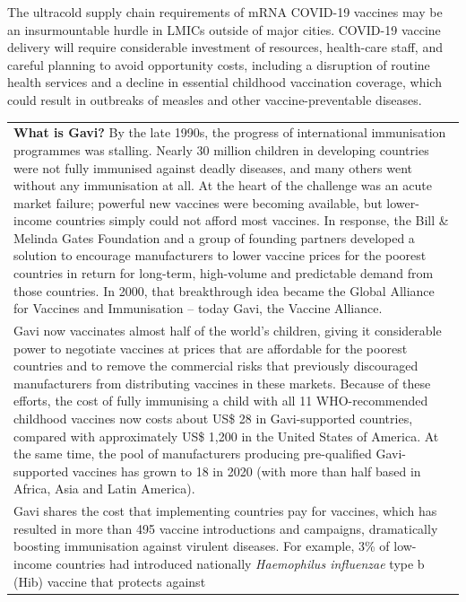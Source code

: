 \documentclass[
  11pt,
  paper=a4,
  ,captions=tableheading
]{scrartcl}
\begin{document}
The ultracold supply chain requirements of mRNA COVID-19 vaccines may be
an insurmountable hurdle in LMICs outside of major cities. COVID-19
vaccine delivery will require considerable investment of resources,
health-care staff, and careful planning to avoid opportunity costs,
including a disruption of routine health services and a decline in
essential childhood vaccination coverage, which could result in
outbreaks of measles and other vaccine-preventable diseases.

\begin{longtable}[]{@{}
  >{\raggedright\arraybackslash}p{}@{}}
\toprule
\endhead
\textbf{What is Gavi?} By the late 1990s, the progress of international
immunisation programmes was stalling. Nearly 30 million children in
developing countries were not fully immunised against deadly diseases,
and many others went without any immunisation at all. At the heart of
the challenge was an acute market failure; powerful new vaccines were
becoming available, but lower-income countries simply could not afford
most vaccines. In response, the Bill \& Melinda Gates Foundation and a
group of founding partners developed a solution to encourage
manufacturers to lower vaccine prices for the poorest countries in
return for long-term, high-volume and predictable demand from those
countries. In 2000, that breakthrough idea became the Global Alliance
for Vaccines and Immunisation -- today Gavi, the Vaccine Alliance. \\
Gavi now vaccinates almost half of the world's children, giving it
considerable power to negotiate vaccines at prices that are affordable
for the poorest countries and to remove the commercial risks that
previously discouraged manufacturers from distributing vaccines in these
markets. Because of these efforts, the cost of fully immunising a child
with all 11 WHO-recommended childhood vaccines now costs about US\$ 28
in Gavi-supported countries, compared with approximately US\$ 1,200 in
the United States of America. At the same time, the pool of
manufacturers producing pre-qualified Gavi-supported vaccines has grown
to 18 in 2020 (with more than half based in Africa, Asia and Latin
America). \\
Gavi shares the cost that implementing countries pay for vaccines, which
has resulted in more than 495 vaccine introductions and campaigns,
dramatically boosting immunisation against virulent diseases. For
example, 3\% of low-income countries had introduced nationally
\emph{Haemophilus influenzae} type b (Hib) vaccine that protects against

\end{longtable}
\end{document}
